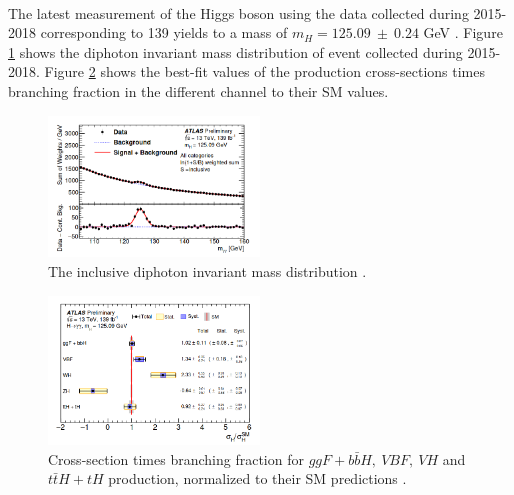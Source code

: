\\
The latest measurement of the Higgs boson using the data collected during 2015-2018 corresponding to 139 \ifb yields to a mass of $m_{H}=125.09 \ \pm \ 0.24 $ GeV \cite{Mass}. Figure \ref{fig:chap1:H2012:MyyRun2} shows the diphoton invariant mass distribution of event collected during 2015-2018. Figure \ref{fig:chap1:H2012:HXsecRun2} shows the best-fit values of the production cross-sections times branching fraction in the different channel to their SM values.
\begin{figure}[htbp]
    \centering
    \includegraphics[width=0.5\textwidth]{Ch1/Img/myy_run2.png}
    \caption{The inclusive diphoton invariant mass distribution \cite{ATLAS_2020}.}
    \label{fig:chap1:H2012:MyyRun2}
\end{figure}
\begin{figure}[htbp]
    \centering
    \includegraphics[width=0.5\textwidth]{Ch1/Img/HXsecRun2.png}
    \caption{Cross-section times branching fraction for $ggF+b\bar{b}H , \ VBF, \ VH$ and $t\bar{t}H + tH$ production, normalized to their SM predictions \cite{ATLAS_2020}.}
    \label{fig:chap1:H2012:HXsecRun2}
\end{figure}
\\

